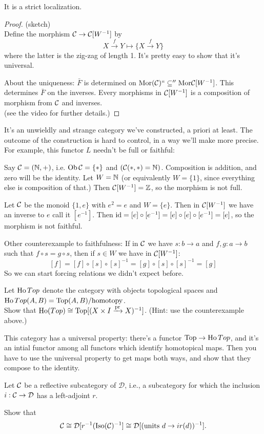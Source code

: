 \documentclass[class=report, crop=false,a4paper,twoside]{standalone}
\begin{document}
\begin{proposition}
	It is a strict localization.
\end{proposition}

\begin{proof}
	(sketch)\\
	Define the morphism $\mathcal{C} \to \mathcal{C}[W^{-1}]$ by
	\[
	X \xrightarrow{f} Y \mapsto \{X \xrightarrow{f} Y\}
	\]
	where the latter is the zig-zag of length 1. It's pretty easy to show that it's universal.
		
	About the uniqueness: $\bar{F}$ is determined on $\text{Mor}(\mathcal{C}) `` \subseteq '' \text{Mor}\mathcal{C}[W^{-1}]$.
	This determines $\bar{F}$ on the inverses. Every morphisms in $\mathcal{C}[W^{-1}]$ is a composition of morphism from $\mathcal{C}$ and inverses.\\
	(see the video for further details.) 
\end{proof}

It's an unwieldly and strange category we've constructed, a priori at least. The outcome of the construction is hard to control, in a way we'll make more precise. For example, this functor $L$ needn't be full or faithful:

Say $\mathcal{C} = (\mathbb{N},+)$, i.e. $\operatorname{Ob}\mathcal{C} = \{*\}$ and $(\mathcal{C}(*,*) = \mathbb{N})$. Composition is addition, and zero will be the identity. Let $W = \mathbb{N}$ (or equivalently $W = \{1\}$, since everything else is composition of that.) Then $\mathcal{C}[W^{-1}] = \mathbb{Z}$, so the morphism is not full.

Let $\mathcal{C}$ be the monoid $\{1,e\}$ with $e^2 = e$ and $W = \{e\}$. Then in $\mathcal{C}[W^{-1}]$ we have an inverse to $e$ call it $[e^{-1}]$. Then $\operatorname{id} = [e] \circ [e^{-1}] = [e] \circ [e] \circ [e^{-1}] = [e]$, so the morphism is not faithful.

Other counterexample to faithfulness: If in $\mathcal{C}$ we have $s: b \to a$ and $f,g: a \to b$ such that $f \circ s= g \circ s$, then if $s \in W$ we have in $\mathcal{C}[W^{-1}]$:
\[
[f] = [f] \circ [s] \circ [s]^{-1} = [g] \circ [s] \circ [s]^{-1} = [g]
\]
So we can start forcing relations we didn't expect before.

\begin{exercise}
	Let $\operatorname{Ho}Top$ denote the category with objects topological spaces and $\operatorname{Ho}Top(A,B) = \operatorname{Top}(A,B)/\text{homotopy}$. \\
	Show that $\operatorname{Ho}(Top) \cong \operatorname{Top}[(X \times I \xrightarrow{\operatorname{pr}} X)^{-1}]$. (Hint: use the counterexample above.)

	This category has a universal property: there's a functor $\operatorname{Top} \to \operatorname{Ho}Top$, and it's an intial functor among all functors which identify homotopical maps. Then you have to use the universal property to get maps both ways, and show that they compose to the identity.
\end{exercise}

\begin{exercise}
	Let $\mathcal{C}$ be a reflective subcategory of $\mathcal{D}$, i.e., a subcategory for which the inclusion $i: \mathcal{C} \to \mathcal{D}$ has a left-adjoint $r$.

	Show that 
	\[
	\mathcal{C} \cong \mathcal{D}[r^{-1}(\operatorname{Iso}(\mathcal{C})^{-1}] \cong \mathcal{D}[(\text{units }d \to ir(d))^{-1}]. 
	\]
\end{exercise}
\end{document}
